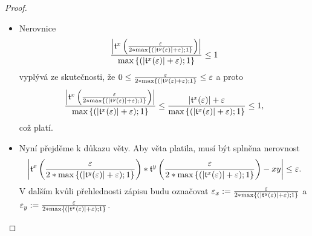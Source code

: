 \begin{theorem}
\begin{proof}
\begin{itemize}
\item{Nerovnice
\begin{equation}\label{ner:abst3}
\frac{\left|\mathfrak{t}^{x}\left(\frac{\varepsilon}{2*\mathrm{max}\left\{(|\mathfrak{t}^{y}(\varepsilon)| + \varepsilon);1\right\}}\right)\right|}{\mathrm{max}\left\{(|\mathfrak{t}^{x}(\varepsilon)| + \varepsilon);1\right\}}\leq 1
\end{equation}
vyplývá ze skutečnosti, že $0\leq\frac{\varepsilon}{2*\mathrm{max}\{(|\mathfrak{t}^{y}(\varepsilon)+\varepsilon);1\}}\leq\varepsilon$ a proto
\begin{equation}
\frac{\left|\mathfrak{t}^{x}\left(\frac{\varepsilon}{2*\mathrm{max}\left\{(|\mathfrak{t}^{y}(\varepsilon)| + \varepsilon);1\right\}}\right)\right|}{\mathrm{max}\left\{(|\mathfrak{t}^{x}(\varepsilon)| + \varepsilon);1\right\}}\leq\frac{|\mathfrak{t}^{x}(\varepsilon)|+\varepsilon}{\mathrm{max}\left\{(|\mathfrak{t}^{x}(\varepsilon)| + \varepsilon);1\right\}}\leq 1,
\end{equation}což platí.}

\item{Nyní přejděme k důkazu věty. Aby věta platila, musí být splněna nerovnost
\begin{equation}
\left| \mathfrak{t}^{x}\left(\frac{\varepsilon}{2*\mathrm{max}\left\{(|\mathfrak{t}^{y}(\varepsilon)| + \varepsilon);1\right\}}\right)*\mathfrak{t}^{y}\left(\frac{\varepsilon}{2*\mathrm{max}\left\{(|\mathfrak{t}^{x}(\varepsilon)| + \varepsilon);1\right\}}\right) -xy \right|\leq\varepsilon.
\end{equation} V dalším kvůli přehlednosti zápisu budu označovat $\varepsilon_x := \frac{\varepsilon}{2*\mathrm{max}\left\{(|\mathfrak{t}^{y}(\varepsilon)| + \varepsilon);1\right\}}$ a $\varepsilon_y := \frac{\varepsilon}{2*\mathrm{max}\left\{(|\mathfrak{t}^{x}(\varepsilon)| + \varepsilon);1\right\}}$.

}
\end{itemize}
\end{proof}
\end{theorem}
